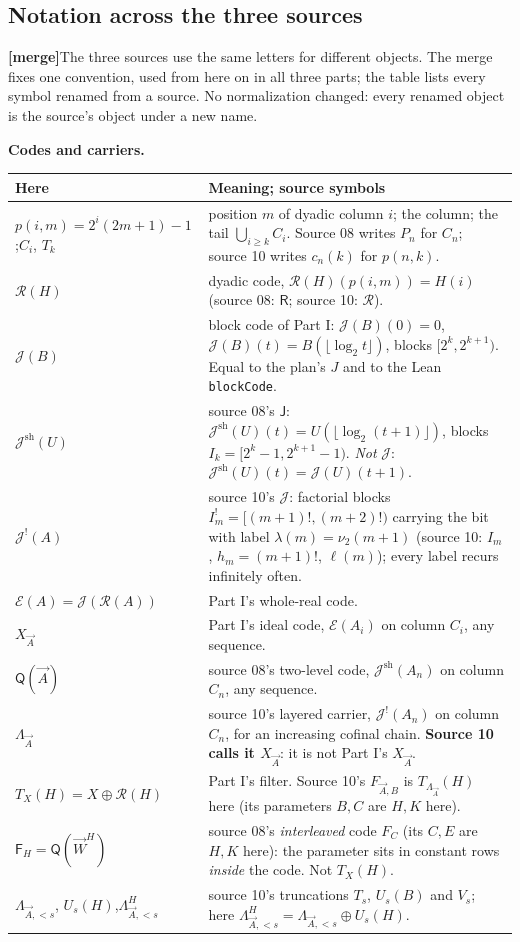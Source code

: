 \documentclass[11pt,letterpaper]{article}
\theoremstyle{plain}
\theoremstyle{definition}
\theoremstyle{remark}
\numberwithin{equation}{section}
\newcommand{\Rcode}{\mathcal R}
\newcommand{\Ecode}{\mathcal E}
\newcommand{\Jcode}{\mathcal J}
\newcommand{\mergenote}[1]{\par\smallskip\noindent
 {\small\textsf{\textbf{[merge]}}\enspace #1}\par\smallskip}
\newcommand{\Jsh}{\mathcal J^{\mathrm{sh}}} %
\newcommand{\Jfac}{\mathcal J^{!}}       %
\newcommand{\QQ}{\mathsf Q}              %
\newcommand{\Fint}{\mathsf F}            %
\newcommand{\WW}{\vec W}                 %
\newcommand{\Lam}{\Lambda_{\vec A}}      %
\begin{document}
\subsection{Notation across the three sources}\label{cr12:sec:notation}
\mergenote{The three sources use the same letters for different objects. The
merge fixes one convention, used from here on in all three parts; the table
lists every symbol renamed from a source. No normalization changed: every renamed
object is the source's object under a new name.}

\begingroup\small
\setlength{\tabcolsep}{4pt}
\noindent\textbf{Codes and carriers.}\par\nopagebreak[4]
\begin{xltabular}{\textwidth}{@{}>{\raggedright\arraybackslash}p{.27\textwidth}>{\raggedright\arraybackslash}X@{}}
\toprule
Here & Meaning; source symbols\\
\midrule
\endhead
$p(i,m)=2^i(2m+1)-1$;\newline $C_i$, $T_k$ & position $m$ of dyadic column $i$; the column; the tail
$\bigcup_{i\ge k}C_i$. Source 08 writes $P_n$ for $C_n$; source 10 writes $c_n(k)$ for
$p(n,k)$.\\
$\Rcode(H)$ & dyadic code, $\Rcode(H)(p(i,m))=H(i)$ (source 08: $\mathsf R$; source 10: $\mathcal R$).\\
$\Jcode(B)$ & block code of Part I: $\Jcode(B)(0)=0$, $\Jcode(B)(t)=B(\lfloor\log_2t\rfloor)$,
blocks $[2^k,2^{k+1})$. Equal to the plan's $J$ and to the Lean \texttt{blockCode}.\\
$\Jsh(U)$ & source 08's $\mathsf J$: $\Jsh(U)(t)=U(\lfloor\log_2(t+1)\rfloor)$, blocks
$I_k=[2^k-1,2^{k+1}-1)$. \emph{Not} $\Jcode$: $\Jsh(U)(t)=\Jcode(U)(t+1)$.\\
$\Jfac(A)$ & source 10's $\mathcal J$: factorial blocks $I^!_m=[(m+1)!,(m+2)!)$ carrying the bit with
label $\lambda(m)=\nu_2(m+1)$ (source 10: $I_m$, $h_m=(m+1)!$, $\ell(m)$); every label recurs
infinitely often.\\
$\Ecode(A)=\Jcode(\Rcode(A))$ & Part I's whole-real code.\\
$X_{\vec A}$ & Part I's ideal code, $\Ecode(A_i)$ on column $C_i$, any sequence.\\
$\QQ(\vec A)$ & source 08's two-level code, $\Jsh(A_n)$ on column $C_n$, any sequence.\\
$\Lam$ & source 10's layered carrier, $\Jfac(A_n)$ on column $C_n$, for an increasing cofinal
chain. \textbf{Source 10 calls it $X_{\vec A}$}: it is not Part I's $X_{\vec A}$.\\
$T_X(H)=X\oplus\Rcode(H)$ & Part I's filter. Source 10's $F_{\vec A,B}$ is $T_{\Lam}(H)$ here
(its parameters $B,C$ are $H,K$ here).\\
$\Fint_H=\QQ(\WW^H)$ & source 08's \emph{interleaved} code $F_C$ (its $C,E$ are $H,K$ here):
the parameter sits in constant rows \emph{inside} the code. Not $T_X(H)$.\\
$\Lambda_{\vec A,<s}$, $U_s(H)$,\newline $\Lambda^H_{\vec A,<s}$ & source 10's truncations
$T_s$, $U_s(B)$ and $V_s$; here $\Lambda^H_{\vec A,<s}=\Lambda_{\vec A,<s}\oplus U_s(H)$.\\
\bottomrule
\end{xltabular}
\end{document}
